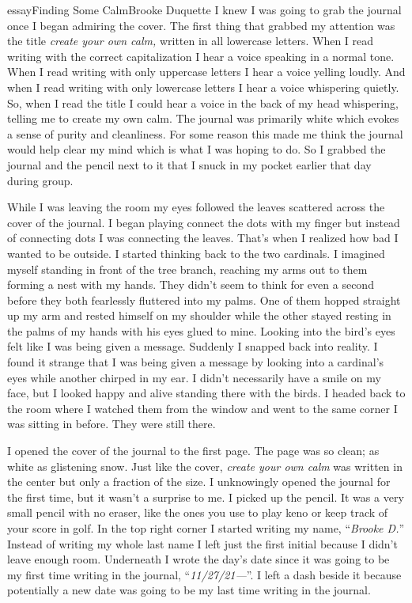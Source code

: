 \begin{prose}{essay}{Finding Some Calm}{Brooke Duquette}
    I knew I was going to grab the journal once I began admiring the cover. The first thing that grabbed my attention was the title \textit{create your own calm,} written in all lowercase letters. When I read writing with the correct capitalization I hear a voice speaking in a normal tone. When I read writing with only uppercase letters I hear a voice yelling loudly. And when I read writing with only lowercase letters I hear a voice whispering quietly. So, when I read the title I could hear a voice in the back of my head whispering, telling me to create my own calm. The journal was primarily white which evokes a sense of purity and cleanliness. For some reason this made me think the journal would help clear my mind which is what I was hoping to do. So I grabbed the journal and the pencil next to it that I snuck in my pocket earlier that day during group.\par
    While I was leaving the room my eyes followed the leaves scattered across the cover of the journal. I began playing connect the dots with my finger but instead of connecting dots I was connecting the leaves. That's when I realized how bad I wanted to be outside. I started thinking back to the two cardinals. I imagined myself standing in front of the tree branch, reaching my arms out to them forming a nest with my hands. They didn't seem to think for even a second before they both fearlessly fluttered into my palms. One of them hopped straight up my arm and rested himself on my shoulder while the other stayed resting in the palms of my hands with his eyes glued to mine. Looking into the bird's eyes felt like I was being given a message. Suddenly I snapped back into reality. I found it strange that I was being given a message by looking into a cardinal's eyes while another chirped in my ear. I didn't necessarily have a smile on my face, but I looked happy and alive standing there with the birds. I headed back to the room where I watched them from the window and went to the same corner I was sitting in before. They were still there.\par
    I opened the cover of the journal to the first page. The page was so clean; as white as glistening snow. Just like the cover, \textit{create your own calm} was written in the center but only a fraction of the size. I unknowingly opened the journal for the first time, but it wasn't a surprise to me. I picked up the pencil. It was a very small pencil with no eraser, like the ones you use to play keno or keep track of your score in golf. In the top right corner I started writing my name, “\textit{Brooke D.}” Instead of writing my whole last name I left just the first initial because I didn't leave enough room. Underneath I wrote the day's date since it was going to be my first time writing in the journal, “\textit{11/27/21---}”. I left a dash beside it because potentially a new date was going to be my last time writing in the journal.\par

\end{prose}
